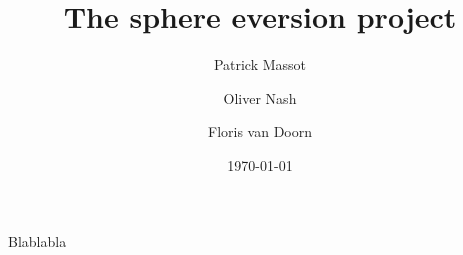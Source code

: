 \documentclass[a4paper]{report}
\date{\today}
\title{The sphere eversion project}
\author{Patrick Massot \and Oliver Nash \and Floris van Doorn}
\begin{document}
\maketitle

Blablabla
%
\end{document}
